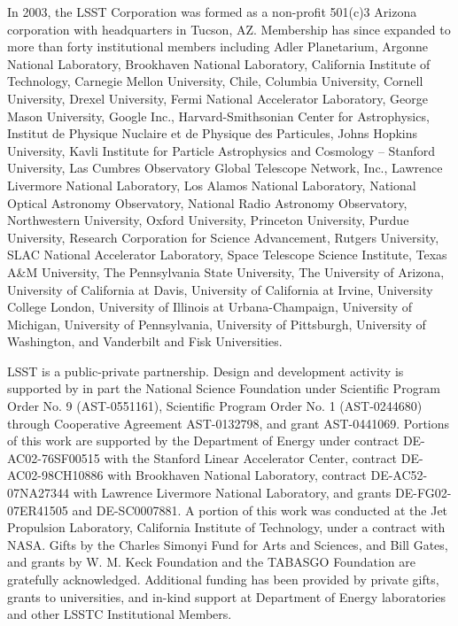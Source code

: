 \documentclass{emulateapj}
\begin{document}
In 2003, the LSST Corporation was formed as a non-profit 501(c)3 Arizona corporation 
with headquarters in Tucson, AZ.  Membership has since expanded to
more than forty institutional members 
including Adler Planetarium, Argonne National Laboratory, Brookhaven National Laboratory, California Institute of Technology,  
Carnegie Mellon University, Chile,  Columbia University, Cornell University, Drexel University, 
Fermi National Accelerator Laboratory, George Mason University, Google Inc., Harvard-Smithsonian 
Center for Astrophysics, Institut de Physique Nuclaire et de Physique des Particules, Johns Hopkins 
University, Kavli Institute for Particle Astrophysics and Cosmology -- Stanford University, Las 
Cumbres Observatory Global Telescope Network, Inc., Lawrence Livermore National Laboratory, 
Los Alamos National Laboratory,  National Optical Astronomy
Observatory, National Radio Astronomy Observatory, Northwestern
University, Oxford University, 
Princeton University, Purdue University, Research Corporation for Science Advancement, Rutgers 
University, SLAC National Accelerator Laboratory, Space Telescope Science Institute, 
Texas A\&M University, The Pennsylvania State University, The University of Arizona, University 
of California at Davis, University of California at Irvine, University College London, University of 
Illinois at Urbana-Champaign, University of Michigan, University of Pennsylvania, University of 
Pittsburgh, University of Washington, and Vanderbilt and Fisk Universities. 

LSST is a public-private partnership.  Design and development activity is
supported by in part the National Science Foundation under Scientific
Program Order No. 9 (AST-0551161), Scientific Program Order No. 1
(AST-0244680) through Cooperative Agreement AST-0132798, and grant AST-0441069. 
Portions of this work are supported by the Department of Energy under contract
DE-AC02-76SF00515 with the Stanford Linear Accelerator Center, contract
DE-AC02-98CH10886 with Brookhaven National Laboratory, contract
DE-AC52-07NA27344 with Lawrence Livermore National Laboratory, and grants
DE-FG02-07ER41505 and DE-SC0007881. A portion of this work was conducted at the Jet Propulsion 
Laboratory, California Institute of Technology, under a contract with NASA.
Gifts by the Charles Simonyi Fund for Arts and Sciences,
and Bill Gates, and grants by W. M. Keck Foundation and the TABASGO Foundation
are gratefully acknowledged. Additional funding has been provided by private gifts, grants 
to universities, and in-kind support at Department of Energy laboratories and other 
LSSTC Institutional Members.  
\end{document}
